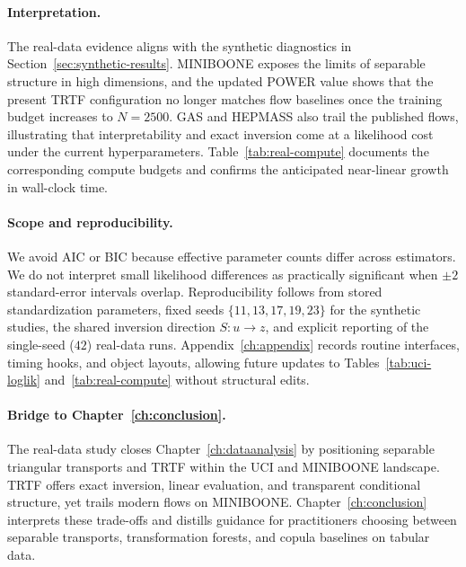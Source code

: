 \documentclass[11pt,a4paper,twoside]{book}\usepackage[]{graphicx}\usepackage[]{xcolor}
\begin{document}
\paragraph{Interpretation.} The real-data evidence aligns with the synthetic diagnostics in Section~\ref{sec:synthetic-results}. MINIBOONE exposes the limits of separable structure in high dimensions, and the updated POWER value shows that the present TRTF configuration no longer matches flow baselines once the training budget increases to $N=2500$. GAS and HEPMASS also trail the published flows, illustrating that interpretability and exact inversion come at a likelihood cost under the current hyperparameters. Table~\ref{tab:real-compute} documents the corresponding compute budgets and confirms the anticipated near-linear growth in wall-clock time.

\paragraph{Scope and reproducibility.} We avoid AIC or BIC because effective parameter counts differ across estimators. We do not interpret small likelihood differences as practically significant when $\pm 2$ standard-error intervals overlap. Reproducibility follows from stored standardization parameters, fixed seeds $\{11, 13, 17, 19, 23\}$ for the synthetic studies, the shared inversion direction $S:u \rightarrow z$, and explicit reporting of the single-seed ($42$) real-data runs. Appendix~\ref{ch:appendix} records routine interfaces, timing hooks, and object layouts, allowing future updates to Tables~\ref{tab:uci-loglik} and~\ref{tab:real-compute} without structural edits.

\paragraph{Bridge to Chapter~\ref{ch:conclusion}.} The real-data study closes Chapter~\ref{ch:dataanalysis} by positioning separable triangular transports and TRTF within the UCI and MINIBOONE landscape. TRTF offers exact inversion, linear evaluation, and transparent conditional structure, yet trails modern flows on MINIBOONE. Chapter~\ref{ch:conclusion} interprets these trade-offs and distills guidance for practitioners choosing between separable transports, transformation forests, and copula baselines on tabular data.



\end{document}
